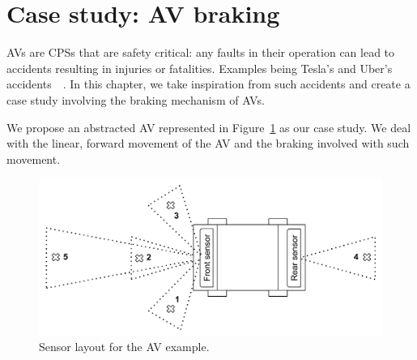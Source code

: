 \section{Case study: \acf{AV} braking}
\label{sec:case}

\acfp{AV} are \acfp{CPS} that are safety critical: any faults in their operation can lead to accidents resulting in injuries or fatalities.
Examples being Tesla's and Uber's accidents~\cite{coldewey_2018}~\cite{stewart_2018}.
In this chapter, we take inspiration from such accidents and create a case study involving the braking mechanism of \acp{AV}.

We propose an abstracted \acf{AV} represented in Figure~\ref{fig:av} as our case study.
We deal with the linear, forward movement of the \ac{AV} and the braking involved with such movement.

\begin{figure}[h]
	\centering
	\includegraphics[scale=0.4]{Content/fig/AV.pdf}
	\caption{Sensor layout for the \ac{AV} example. \label{fig:av}}
\end{figure}


